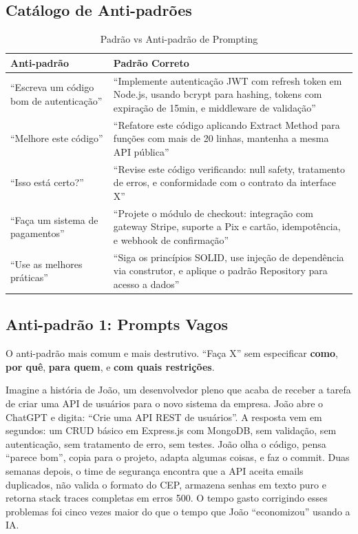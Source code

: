 \subsection{Catálogo de Anti-padrões}

\begin{table}[ht]
\centering
\caption{Padrão vs Anti-padrão de Prompting}
\begin{tabular}{@{}p{5.5cm}p{6.5cm}@{}}
\toprule
\textbf{Anti-padrão} & \textbf{Padrão Correto} \\
\midrule
``Escreva um código bom de autenticação'' &
``Implemente autenticação JWT com refresh token em Node.js, usando bcrypt
para hashing, tokens com expiração de 15min, e middleware de validação'' \\
\addlinespace
``Melhore este código'' &
``Refatore este código aplicando Extract Method para funções com mais de 20
linhas, mantenha a mesma API pública'' \\
\addlinespace
``Isso está certo?'' &
``Revise este código verificando: null safety, tratamento de erros, e
conformidade com o contrato da interface X'' \\
\addlinespace
``Faça um sistema de pagamentos'' &
``Projete o módulo de checkout: integração com gateway Stripe, suporte a
Pix e cartão, idempotência, e webhook de confirmação'' \\
\addlinespace
``Use as melhores práticas'' &
``Siga os princípios SOLID, use injeção de dependência via construtor,
e aplique o padrão Repository para acesso a dados'' \\
\bottomrule
\end{tabular}
\end{table}

\subsection{Anti-padrão 1: Prompts Vagos}

O anti-padrão mais comum e mais destrutivo. ``Faça X'' sem especificar
\textbf{como}, \textbf{por quê}, \textbf{para quem}, e \textbf{com quais
restrições}.

Imagine a história de João, um desenvolvedor pleno que acaba de receber a tarefa
de criar uma API de usuários para o novo sistema da empresa. João abre o ChatGPT
e digita: ``Crie uma API REST de usuários''. A resposta vem em segundos: um CRUD
básico em Express.js com MongoDB, sem validação, sem autenticação, sem tratamento
de erro, sem testes. João olha o código, pensa ``parece bom'', copia para o
projeto, adapta algumas coisas, e faz o commit. Duas semanas depois, o time de
segurança encontra que a API aceita emails duplicados, não valida o formato do
CEP, armazena senhas em texto puro e retorna stack traces completas em erros 500.
O tempo gasto corrigindo esses problemas foi cinco vezes maior do que o tempo que
João ``economizou'' usando a IA.

